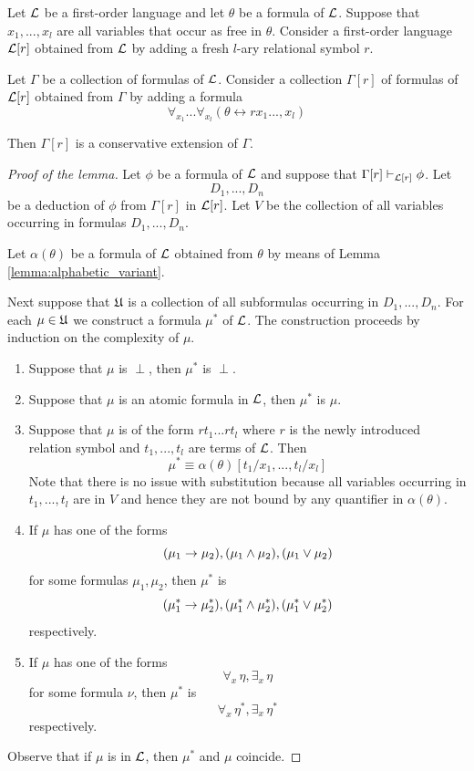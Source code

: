 \documentclass[10pt]{amsart}
\begin{document}
\begin{lemma}\label{lemma:single_definitional_extension_by_relation_symbol_is_conservative}
	Let ${\mathcal L}$ be a first-order language and let $\theta$ be a formula of ${\mathcal L}$. Suppose that $x_1,...,x_l$ are all variables that occur as free in $\theta$. Consider a first-order language ${\mathcal L}[r]$ obtained from ${\mathcal L}$ by adding a fresh $l$-ary relational symbol $r$.

  Let $\Gamma$ be a collection of formulas of ${\mathcal L}$. Consider a collection $\Gamma[r]$ of formulas of ${\mathcal L}[r]$ obtained from $\Gamma$ by adding a formula
  $$\forall_{x_1}...\forall_{x_{l}}\left(\theta \leftrightarrow rx_1...,x_{l}\right)$$

  Then $\Gamma[r]$ is a conservative extension of $\Gamma$.
\end{lemma}
\begin{proof}[Proof of the lemma]
  Let $\phi$ be a formula of ${\mathcal L}$ and suppose that $\Gamma[r] \vdash_{{\mathcal L}[r]} \phi$. Let 
  $$D_1,...,D_n$$
  be a deduction of $\phi$ from $\Gamma[r]$ in ${\mathcal L}[r]$. Let $V$ be the collection of all variables occurring in formulas $D_1,...,D_n$.

  Let $\alpha(\theta)$ be a formula of ${\mathcal L}$ obtained from $\theta$ by means of Lemma \ref{lemma:alphabetic_variant}.

	Next suppose that ${\mathfrak U}$ is a collection of all subformulas occurring in $D_1,...,D_n$. For each $\mu \in {\mathfrak U}$ we construct a formula $\mu^*$ of ${\mathcal L}$. The construction proceeds by induction on the complexity of $\mu$.
	\begin{enumerate}[label=\textbf{(\arabic*)}, leftmargin=3.0em]
		\item Suppose that $\mu$ is $\perp$, then $\mu^*$ is $\perp$.
		\item Suppose that $\mu$ is an atomic formula in ${\mathcal L}$, then $\mu^*$ is $\mu$.
    \item Suppose that $\mu$ is of the form $rt_1...rt_l$ where $r$ is the newly introduced relation symbol and $t_1,...,t_l$ are terms of ${\mathcal L}$. Then
      $$\mu^* \equiv \alpha(\theta)[t_1/x_1,...,t_l/x_l]$$
      Note that there is no issue with substitution because all variables occurring in $t_1,...,t_l$ are in $V$ and hence they are not bound by any quantifier in $\alpha(\theta)$. 
		\item If $\mu$ has one of the forms
		      $$(\mu_1 \rightarrow \mu_2), (\mu_1 \wedge \mu_2), (\mu_1 \vee \mu_2)$$
		      for some formulas $\mu_1,\mu_2$, then $\mu^*$ is
		      $$(\mu_1^* \rightarrow \mu_2^*), (\mu_1^* \wedge \mu_2^{*}), (\mu_1^{*} \vee \mu_2^{*})$$
          respectively.
		\item If $\mu$ has one of the forms 
      $$\forall_x\,\eta, \exists_x\,\eta$$
      for some formula $\nu$, then $\mu^*$ is
		  $$\forall_x\,\eta^*, \exists_x\,\eta^*$$
      respectively.
	\end{enumerate}
  Observe that if $\mu$ is in ${\mathcal L}$, then $\mu^*$ and $\mu$ coincide.


\end{proof}
\end{document}
